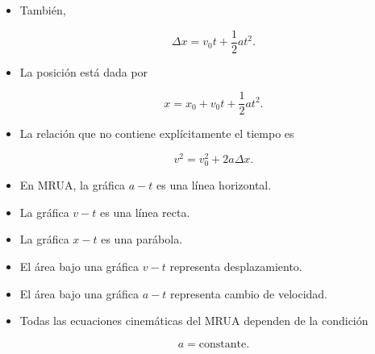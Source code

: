 \begin{resumen}
\begin{itemize}
    \[
    \boxed{\Delta x=\frac{v_0+v}{2}\,t}.
    \]

    \item También,

    \[
    \boxed{\Delta x=v_0t+\frac{1}{2}at^2}.
    \]

    \item La posición está dada por

    \[
    \boxed{x=x_0+v_0t+\frac{1}{2}at^2}.
    \]

    \item La relación que no contiene explícitamente el tiempo es

    \[
    \boxed{v^2=v_0^2+2a\Delta x}.
    \]

    \item En MRUA, la gráfica \(a-t\) es una línea horizontal.

    \item La gráfica \(v-t\) es una línea recta.

    \item La gráfica \(x-t\) es una parábola.

    \item El área bajo una gráfica \(v-t\) representa desplazamiento.

    \item El área bajo una gráfica \(a-t\) representa cambio de velocidad.

    \item Todas las ecuaciones cinemáticas del MRUA dependen de la condición

    \[
    a=\text{constante}.
    \]

\end{itemize}

\end{resumen}